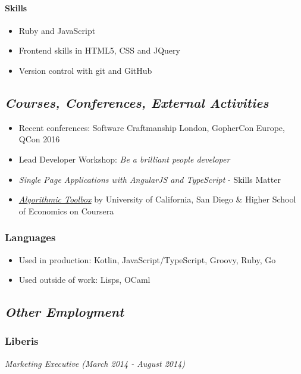 \documentclass[11pt]{article}
\begin{document}
\paragraph*{Skills}
\label{sec:org9dfebb4}
\begin{itemize}
\item Ruby and JavaScript
\item Frontend skills in HTML5, CSS and JQuery
\item Version control with git and GitHub
\end{itemize}

\subsection*{\emph{Courses, Conferences, External Activities}}
\label{sec:org152c954}
\begin{itemize}
\item Recent conferences: Software Craftmanship London, GopherCon Europe, QCon 2016
\item Lead Developer Workshop: \emph{Be a brilliant people developer}
\item \emph{Single Page Applications with AngularJS and TypeScript} - Skills Matter
\item \href{https://www.coursera.org/account/accomplishments/records/C58NGM7GQS84}{\emph{Algorithmic Toolbox}} by University of California, San Diego \& Higher School of Economics on Coursera
\end{itemize}

\subsubsection*{Languages}
\label{sec:orge700dcd}
\begin{itemize}
\item Used in production: Kotlin, JavaScript/TypeScript, Groovy, Ruby, Go
\item Used outside of work: Lisps, OCaml
\end{itemize}

\subsection*{\emph{Other Employment}}
\label{sec:orgff27a67}
\subsubsection*{Liberis}
\label{sec:orgf4d7c02}
\emph{Marketing Executive (March 2014 - August 2014)}
\end{document}
